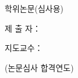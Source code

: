 \thispagestyle{empty}
\begin{center}
  \begin{flushright}
  {\fontsize{10}{17}\selectfont \degreetype 학위논문(심사용)}
  \end{flushright}

  \vspace{10mm}

  {\fontsize{20}{26}\selectfont \thesistitleko}
  
  {\fontsize{15}{26}\selectfont \thesistitlekosub}

  \vspace{8mm}

  {\fontsize{13}{16}\selectfont \thesistitlenone}

  {\fontsize{13}{16}\selectfont \thesistitlentwo}

  \vspace{35mm}

  {\fontsize{13}{17}\selectfont 제 출 자：\authorname}

  \vspace{5mm}

  {\fontsize{13}{17}\selectfont 지도교수：\advisorname}

  \vspace{30mm}

  {\fontsize{15}{17}\selectfont \submityear(논문심사 합격연도)}

  \vspace{15mm}

  {\fontsize{14}{18}\selectfont \department}

  \vspace{3mm}

  {\fontsize{14}{18}\selectfont \major}

  \vspace{5mm}

  {\fontsize{15}{19}\selectfont \gradschool}
\end{center}
\newpage